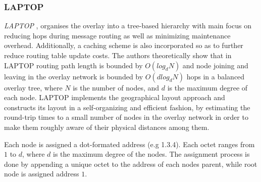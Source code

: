 \subsubsection{LAPTOP}
\emph{LAPTOP} \cite{wu_laptop_2007}, organises the overlay into a tree-based
hierarchy with main focus on reducing hops during message routing as well as
minimizing maintenance overhead. Additionally, a caching scheme is also
incorporated so as to further reduce routing table update costs. The authors
theoretically show that in LAPTOP routing path length is bounded by $O(log_d N)$
and node joining and leaving in the overlay network is bounded by
$O\left( d log_d N \right)$ hops in a balanced overlay tree, where $N$ is the
number of nodes, and $d$ is the maximum degree of each node. LAPTOP implements
the geographical layout approach  and constructs its layout in a self-organizing
and efficient fashion, by estimating the round-trip times to a small number of
nodes in the overlay network in order to make them roughly aware of their
physical distances among them.

Each node is assigned a dot-formated address (e.g 1.3.4). Each octet ranges from
$1$ to $d$, where $d$ is the maximum degree of the nodes. The assignment process
is done by appending a unique octet to the address of each nodes parent, while
root node is assigned address $1$.

%

